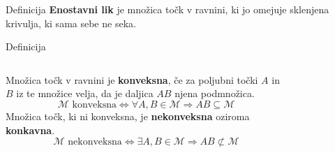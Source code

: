         \begin{frame}
            \begin{alertblock}{Definicija}
                \textbf{Enostavni lik} je množica točk v ravnini, ki jo omejuje sklenjena krivulja, ki sama sebe ne seka.
            \end{alertblock}

            \begin{alertblock}{Definicija}
                \begin{columns}

                Množica točk v ravnini je \textbf{konveksna}, če za poljubni točki $A$ in $B$ iz te množice velja, da je daljica $AB$ njena podmnožica.
                $$ \mathcal{M}\text{~konveksna} \Leftrightarrow \forall A, B\in\mathcal{M}\Rightarrow AB\subseteq\mathcal{M} $$
                Množica točk, ki ni konveksna, je \textbf{nekonveksna} oziroma \textbf{konkavna}.
                $$ \mathcal{M}\text{~nekonveksna} \Leftrightarrow \exists A, B\in\mathcal{M}\Rightarrow AB\not\subset\mathcal{M} $$
            
                \begin{figure}[H]
\end{figure}
\end{columns}
\end{alertblock}
\end{frame}
